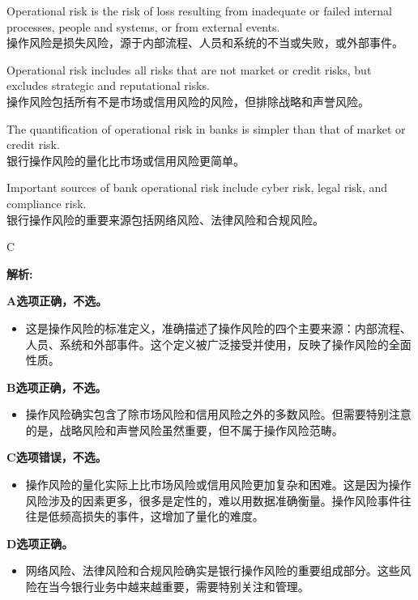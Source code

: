 \documentclass{article}
\newenvironment{explanation}
{\textbf{解析:}\par}
{\par}
\begin{document}
\begin{choices}
    \item Operational risk is the risk of loss resulting from inadequate or failed internal processes, people and systems, or from external events.\\操作风险是损失风险，源于内部流程、人员和系统的不当或失败，或外部事件。
    \item Operational risk includes all risks that are not market or credit risks, but excludes strategic and reputational risks.\\操作风险包括所有不是市场或信用风险的风险，但排除战略和声誉风险。
    \item The quantification of operational risk in banks is simpler than that of market or credit risk.\\银行操作风险的量化比市场或信用风险更简单。
    \item Important sources of bank operational risk include cyber risk, legal risk, and compliance risk.\\银行操作风险的重要来源包括网络风险、法律风险和合规风险。
\end{choices}

\begin{correctanswer}
    C
\end{correctanswer}

\begin{explanation}
    \textbf{A选项正确，不选。}
    \begin{itemize}
        \item 这是操作风险的标准定义，准确描述了操作风险的四个主要来源：内部流程、人员、系统和外部事件。这个定义被广泛接受并使用，反映了操作风险的全面性质。
    \end{itemize}

    \textbf{B选项正确，不选。}
    \begin{itemize}
        \item 操作风险确实包含了除市场风险和信用风险之外的多数风险。但需要特别注意的是，战略风险和声誉风险虽然重要，但不属于操作风险范畴。
    \end{itemize}

    \textbf{C选项错误，不选。}
    \begin{itemize}
        \item 操作风险的量化实际上比市场风险或信用风险更加复杂和困难。这是因为操作风险涉及的因素更多，很多是定性的，难以用数据准确衡量。操作风险事件往往是低频高损失的事件，这增加了量化的难度。
    \end{itemize}

    \textbf{D选项正确。}
    \begin{itemize}
        \item 网络风险、法律风险和合规风险确实是银行操作风险的重要组成部分。这些风险在当今银行业务中越来越重要，需要特别关注和管理。
    \end{itemize}
\end{explanation}
\end{document}
